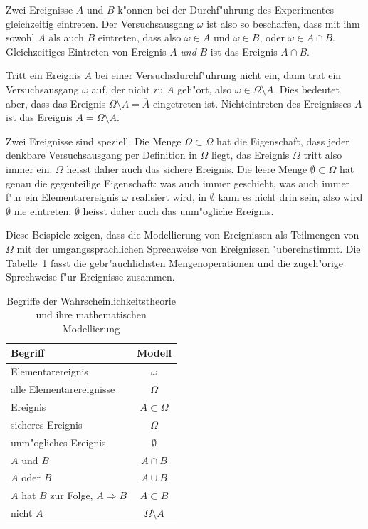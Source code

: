 Zwei Ereignisse $A$ und $B$ k"onnen bei der Durchf"uhrung des Experimentes
gleichzeitig eintreten.
Der Versuchsausgang $\omega$ ist also so beschaffen, dass mit ihm sowohl
$A$ als auch $B$ eintreten, dass also $\omega\in A$ und $\omega\in B$,
oder $\omega \in A\cap B$.
Gleichzeitiges Eintreten von Ereignis $A$ {\em und} $B$ ist das Ereignis
$A\cap B$.

Tritt ein Ereignis $A$ bei einer Versuchsdurchf"uhrung nicht ein, dann trat
ein Versuchsausgang $\omega$ auf, der nicht zu $A$ geh"ort,
also $\omega\in\Omega\setminus A$.
Dies bedeutet aber, dass das Ereignis $\Omega\setminus A=\overline{A}$
eingetreten ist.
Nichteintreten des Ereignisses $A$ ist das Ereignis
$\overline{A}=\Omega\setminus A$.

Zwei Ereignisse sind speziell.
Die Menge $\Omega\subset\Omega$ hat die Eigenschaft, dass jeder denkbare
Versuchsausgang per Definition in $\Omega$ liegt, das Ereignis $\Omega$
tritt also immer ein.
$\Omega$ heisst daher auch das sichere Ereignis.
Die leere Menge $\emptyset\subset\Omega$ hat genau die gegenteilige
Eigenschaft: was auch immer geschieht, was auch immer f"ur ein 
Elementarereignis $\omega$ realisiert wird, in $\emptyset$ kann es
nicht drin sein, also wird $\emptyset$ nie eintreten.
$\emptyset$ heisst daher auch das unm"ogliche Ereignis.

Diese Beispiele zeigen, dass die Modellierung von Ereignissen als Teilmengen
von $\Omega$
mit der umgangssprachlichen Sprechweise von Ereignissen "ubereinstimmt.
Die Tabelle~\ref{begriffe-zusammenfassung}
fasst die gebr"auchlichsten Mengenoperationen und die zugeh"orige
Sprechweise f"ur Ereignisse zusammen.

\begin{table}
\begin{center}
\begin{tabular}{|l|c|}
\hline
Begriff&Modell\\
\hline
Elementarereignis&$\omega$\\
alle Elementarereignisse&$\Omega$\\
Ereignis&$A\subset\Omega$\\
sicheres Ereignis&$\Omega$\\
unm"ogliches Ereignis&$\emptyset$\\
$A$ und $B$&$A\cap B$\\
$A$ oder $B$&$A\cup B$\\
$A$ hat $B$ zur Folge, $A\Rightarrow B$&$A\subset B$\\
nicht $A$&$\Omega\setminus A$\\
\hline
\end{tabular}
\end{center}
\caption{Begriffe der Wahrscheinlichkeitstheorie und ihre mathematischen
Modellierung\label{begriffe-zusammenfassung}}
\end{table}

